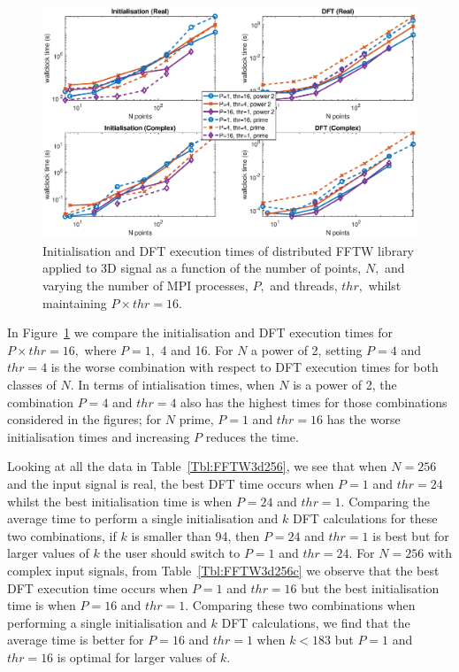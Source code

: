 \documentclass[a4paper]{article}
\begin{document}
\begin{figure}[htb]
    \centering
    \includegraphics[width=0.9\linewidth]{../results/fftw_3d_mpi_thr.eps}
  \caption{Initialisation and DFT execution times of distributed FFTW library applied to 3D signal as a function of the
    number of points, $N,$ and varying the number of MPI processes, $P,$ and threads, $thr,$ whilst maintaining $P\times thr=16.$}
  \label{3DDistFFTW16}
\end{figure}


In Figure~\ref{3DDistFFTW16} we compare the initialisation and DFT
execution times for $P\times thr=16,$ where $P=1,$ 4 and 16. For $N$ a
power of 2, setting $P=4$ and $thr=4$ is the worse combination with
respect to DFT execution times for both classes of $N.$ In terms of
intialisation times, when $N$ is a power of 2, the combination $P=4$
and $thr=4$ also has the highest times for those combinations
considered in the figures; for $N$ prime, $P=1$ and $thr=16$ has the
worse initialisation times and increasing $P$ reduces the time.

Looking at all the data in Table~\ref{Tbl:FFTW3d256}, we see that when
$N=256$ and the input signal is real, the best DFT time occurs when
$P=1$ and $thr=24$ whilst the best initialisation time is when $P=24$
and $thr=1.$ Comparing the average time to perform a single
initialisation and $k$ DFT calculations for these two combinations, if
$k$ is smaller than 94, then $P=24$ and $thr=1$ is best but for larger
values of $k$ the user should switch to $P=1$ and $thr=24.$ For
$N=256$ with complex input signals, from Table~\ref{Tbl:FFTW3d256c} we
observe that the best DFT execution time occurs when $P=1$ and
$thr=16$ but the best initialisation time is when $P=16$ and $thr=1.$
Comparing these two combinations when performing a single
initialisation and $k$ DFT calculations, we find that the average time
is better for $P=16$ and $thr=1$ when $k<183$ but $P=1$ and $thr=16$
is optimal for larger values of $k.$
\end{document}

